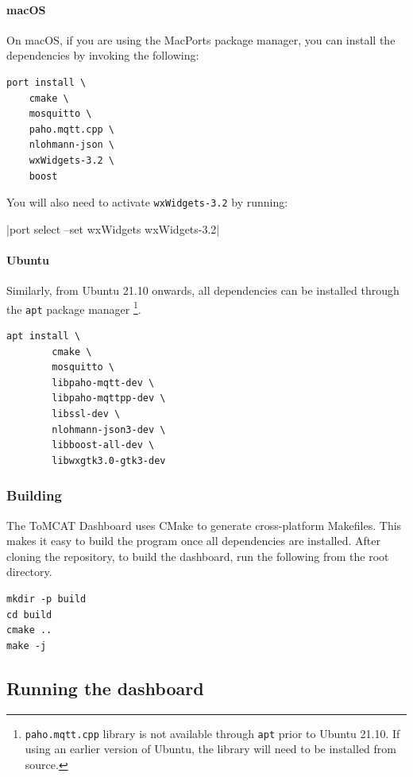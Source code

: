 \paragraph{macOS} On macOS, if you are using the MacPorts package manager, you
can install the dependencies by invoking the following:

\begin{verbatim}
port install \
    cmake \
    mosquitto \
    paho.mqtt.cpp \
    nlohmann-json \
    wxWidgets-3.2 \
    boost
\end{verbatim}

\noindent You will also need to activate \texttt{wxWidgets-3.2} by running:

\mint{shell}|port select --set wxWidgets wxWidgets-3.2|

\paragraph{Ubuntu} Similarly, from Ubuntu 21.10 onwards, all dependencies can
be installed through the \texttt{apt} package manager
\footnote{\texttt{paho.mqtt.cpp} library  is not available through \texttt{apt}
    prior to Ubuntu 21.10. If using an earlier version of Ubuntu, the library
will need to be installed from source.  }.

\begin{verbatim}
apt install \
        cmake \
        mosquitto \
        libpaho-mqtt-dev \
        libpaho-mqttpp-dev \
        libssl-dev \
        nlohmann-json3-dev \
        libboost-all-dev \
        libwxgtk3.0-gtk3-dev
\end{verbatim}

\subsubsection{Building}

The ToMCAT Dashboard uses CMake to generate cross-platform Makefiles. This
makes it easy to build the program once all dependencies are installed. After
cloning the repository, to build the dashboard, run the following from the root
directory.

\begin{verbatim}
mkdir -p build
cd build
cmake ..
make -j
\end{verbatim}


\subsection{Running the dashboard}

